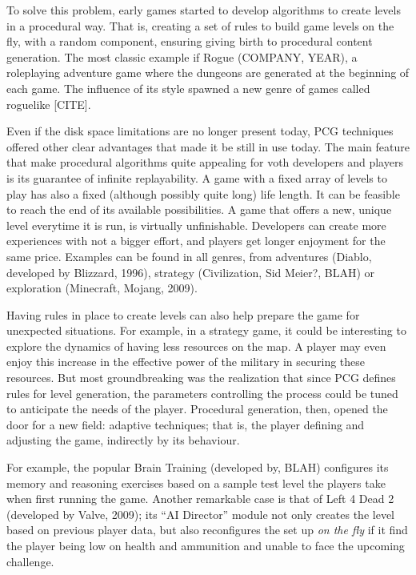 \documentclass[conference]{IEEEtran}
\begin{document}
To solve this problem, early games started to develop algorithms to create levels in a procedural way. That is, creating a set of rules to build game levels on the fly, with a random component, ensuring  giving birth to procedural content generation. The most classic example if Rogue (COMPANY, YEAR), a roleplaying adventure game where the dungeons are generated at the beginning of each game. The influence of its style spawned a new genre of games called roguelike [CITE].

Even if the disk space limitations are no longer present today, PCG techniques offered other clear advantages that made it be still in use today. The main feature that make procedural algorithms quite appealing for voth developers and players is its guarantee of infinite replayability. A game with a fixed array of levels to play has also a fixed (although possibly quite long) life length. It can be feasible to reach the end of its available possibilities. A game that offers a new, unique level everytime it is run, is virtually unfinishable. Developers can create more experiences with not a bigger effort, and players get longer enjoyment for the same price. Examples can be found in all genres, from adventures (Diablo, developed by Blizzard, 1996), strategy (Civilization, Sid Meier?, BLAH) or exploration (Minecraft, Mojang, 2009).

Having rules in place to create levels can also help prepare the game for unexpected situations. For example, in a strategy game, it could be interesting to explore the dynamics of having less resources on the map. A player may even enjoy this increase in the effective power of the military in securing these resources. But most groundbreaking was the realization that since PCG defines rules for level generation, the parameters controlling the process could be tuned to anticipate the needs of the player. Procedural generation, then, opened the door for a new field: adaptive techniques; that is, the player defining and adjusting the game, indirectly by its behaviour. 

For example, the popular Brain Training (developed by, BLAH) configures its memory and reasoning exercises based on a sample test level the players take when first running the game. Another remarkable case is that of Left 4 Dead 2 (developed by Valve, 2009); its ``AI Director'' module not only creates the level based on previous player data, but also reconfigures the set up \textit{on the fly} if it find the player being low on health and ammunition and unable to face the upcoming challenge.
\end{document}
